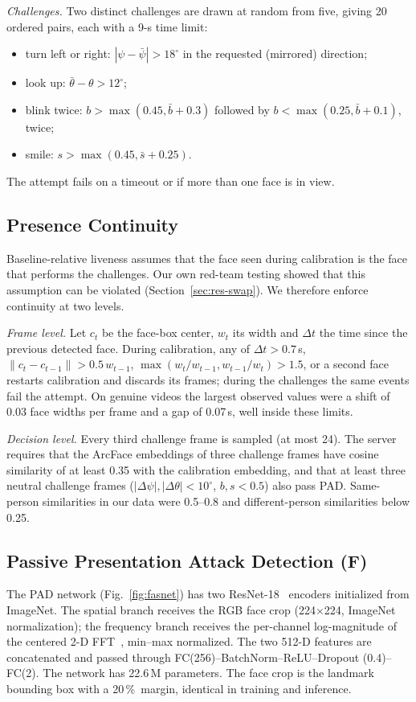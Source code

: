 \documentclass{ieeeaccess}
\newcommand{\pct}{\,\%}
\begin{document}
\emph{Challenges.} Two distinct challenges are drawn at random from five, giving 20 ordered pairs, each
with a 9-s time limit:
\begin{itemize}
\item turn left or right: $|\psi-\bar{\psi}|>18^\circ$ in the requested (mirrored) direction;
\item look up: $\bar{\theta}-\theta>12^\circ$;
\item blink twice: $b>\max(0.45,\bar{b}+0.3)$ followed by $b<\max(0.25,\bar{b}+0.1)$, twice;
\item smile: $s>\max(0.45,\bar{s}+0.25)$.
\end{itemize}
The attempt fails on a timeout or if more than one face is in view.

\subsection{Presence Continuity}
\label{sec:continuity}
Baseline-relative liveness assumes that the face seen during calibration is the face that performs the
challenges. Our own red-team testing showed that this assumption can be violated
(Section~\ref{sec:res-swap}). We therefore enforce continuity at two levels.

\emph{Frame level.} Let $c_t$ be the face-box center, $w_t$ its width and $\Delta t$ the time since the
previous detected face. During calibration, any of $\Delta t>0.7$\,s, $\lVert c_t-c_{t-1}\rVert>0.5\,
w_{t-1}$, $\max(w_t/w_{t-1},w_{t-1}/w_t)>1.5$, or a second face restarts calibration and discards its
frames; during the challenges the same events fail the attempt. On genuine videos the largest observed
values were a shift of 0.03 face widths per frame and a gap of 0.07\,s, well inside these limits.

\emph{Decision level.} Every third challenge frame is sampled (at most 24). The server requires that
the ArcFace embeddings of three challenge frames have cosine similarity of at least 0.35 with the
calibration embedding, and that at least three neutral challenge frames
($|\Delta\psi|,|\Delta\theta|<10^\circ$, $b,s<0.5$) also pass PAD. Same-person similarities in our
data were 0.5--0.8 and different-person similarities below 0.25.

\subsection{Passive Presentation Attack Detection (F)}
\label{sec:pad}
The PAD network (Fig.~\ref{fig:fasnet}) has two ResNet-18~\cite{resnet} encoders initialized from
ImageNet. The spatial branch receives the RGB face crop (224$\times$224, ImageNet normalization); the
frequency branch receives the per-channel log-magnitude of the centered 2-D FFT~\cite{fft}, min--max
normalized. The two 512-D features are concatenated and passed through FC(256)--BatchNorm--ReLU--Dropout
(0.4)--FC(2). The network has 22.6\,M parameters. The face crop is the landmark bounding box with a
20\pct\ margin, identical in training and inference.
\end{document}
